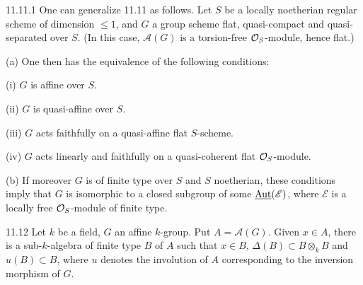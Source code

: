 \begin{remark}{11.11.1}\label{VIB.11.11.1}
One can generalize 11.11 as follows. Let $S$ be a locally noetherian regular scheme of dimension $\leq1$, and $G$ a group scheme flat, quasi-compact and quasi-separated over $S$. (In this case, $\mathscr A(G)$ is a torsion-free $\mathcal{O}_S$-module, hence flat.)

(a) One then has the equivalence of the following conditions:

(i) $G$ is affine over $S$.

(ii) $G$ is quasi-affine over $S$.

(iii) $G$ acts faithfully on a quasi-affine flat $S$-scheme.

(iv) $G$ acts linearly and faithfully on a quasi-coherent flat $\mathcal{O}_S$-module.

(b) If moreover $G$ is of finite type over $S$ and $S$ noetherian, these conditions imply that $G$ is isomorphic to a closed subgroup of some $\underline{\operatorname{Aut}}(\mathscr E)$, where $\mathscr E$ is a locally free $\mathcal{O}_S$-module of finite type.
\end{remark}

\begin{lemma}{11.12}\label{VIB.11.12}
Let $k$ be a field, $G$ an affine $k$-group. Put $A=\mathscr A(G)$. Given $x\in A$, there is a sub-$k$-algebra of finite type $B$ of $A$ such that $x\in B$, $\Delta(B)\subset B\otimes_k B$ and $u(B)\subset B$, where $u$ denotes the involution of $A$ corresponding to the inversion morphism of $G$.
\end{lemma}
